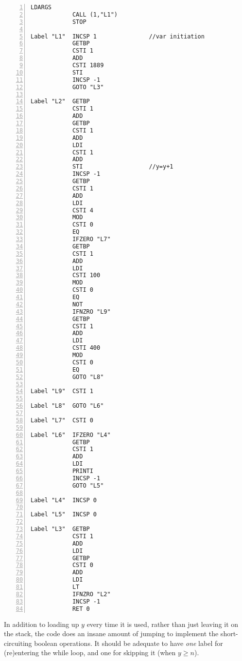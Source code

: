 \documentclass[a4paper, titlepage]{article}
\begin{document}
\begin{lstlisting}[numbers=left, title=ex13.c]
            LDARGS
            CALL (1,"L1")
            STOP

Label "L1"  INCSP 1               //var initiation
            GETBP
            CSTI 1
            ADD
            CSTI 1889
            STI
            INCSP -1
            GOTO "L3"

Label "L2"  GETBP
            CSTI 1
            ADD
            GETBP
            CSTI 1
            ADD
            LDI
            CSTI 1
            ADD
            STI                   //y=y+1
            INCSP -1
            GETBP
            CSTI 1
            ADD
            LDI
            CSTI 4
            MOD
            CSTI 0
            EQ
            IFZERO "L7"
            GETBP
            CSTI 1
            ADD
            LDI
            CSTI 100
            MOD
            CSTI 0
            EQ
            NOT
            IFNZRO "L9"
            GETBP
            CSTI 1
            ADD
            LDI
            CSTI 400
            MOD
            CSTI 0
            EQ
            GOTO "L8"

Label "L9"  CSTI 1

Label "L8"  GOTO "L6"

Label "L7"  CSTI 0

Label "L6"  IFZERO "L4"
            GETBP
            CSTI 1
            ADD
            LDI
            PRINTI
            INCSP -1
            GOTO "L5"

Label "L4"  INCSP 0

Label "L5"  INCSP 0

Label "L3"  GETBP
            CSTI 1
            ADD
            LDI
            GETBP
            CSTI 0
            ADD
            LDI
            LT
            IFNZRO "L2"
            INCSP -1
            RET 0
\end{lstlisting}
In addition to loading up $y$ every time it is used, rather than just leaving
it on the stack, the code does an insane amount of jumping to implement the
short-circuiting boolean operations. It should be adequate to have \emph{one}
label for (re)entering the while loop, and one for skipping it (when $y\ge n$).
\end{document}
